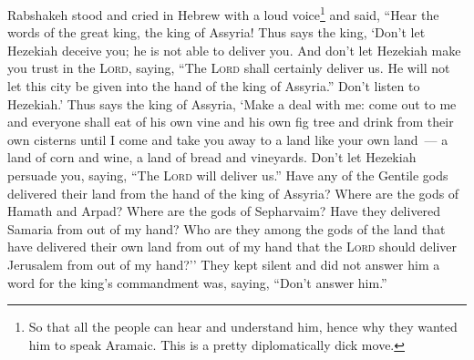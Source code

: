 \begin{enumerate*}[mode=unboxed]
     Rabshakeh stood and cried in Hebrew with a loud voice\footnote{So that all the people can hear and understand him, hence why they wanted him to speak Aramaic. This is a pretty diplomatically dick move.} and said, ``Hear the words of the great king, the king of Assyria!%
     Thus says the king, `Don't let Hezekiah deceive you; he is not able to deliver you.%
     And don't let Hezekiah make you trust in the \textsc{Lord}, saying, ``The \textsc{Lord} shall certainly deliver us. He will not let this city be given into the hand of the king of Assyria.''%
     Don't listen to Hezekiah.' Thus says the king of Assyria, `Make a deal with me: come out to me and everyone shall eat of his own vine and his own fig tree and drink from their own cisterns%
     until I come and take you away to a land like your own land~--- a land of corn and wine, a land of bread and vineyards.%
     Don't let Hezekiah persuade you, saying, ``The \textsc{Lord} will deliver us.'' Have any of the Gentile gods delivered their land from the hand of the king of Assyria?%
     Where are the gods of Hamath and Arpad? Where are the gods of Sepharvaim? Have they delivered Samaria from out of my hand?%
     Who are they among the gods of the land that have delivered their own land from out of my hand that the \textsc{Lord} should deliver Jerusalem from out of my hand?''%
     They kept silent and did not answer him a word for the king's commandment was, saying, ``Don't answer him.''%
\end{enumerate*}
